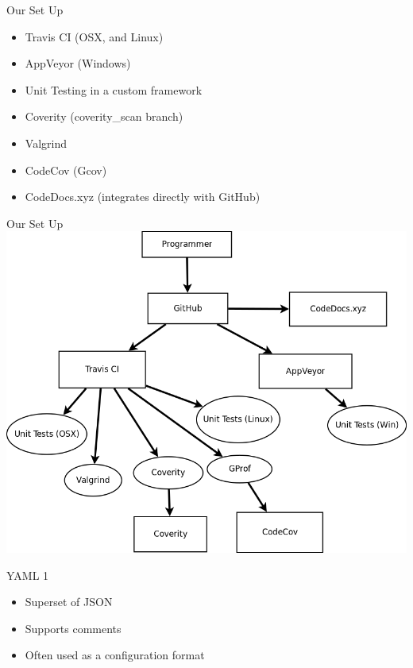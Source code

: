 \documentclass{beamer}
\begin{document}
\begin{frame}{Our Set Up}
	\begin{itemize}
		\item Travis CI (OSX, and Linux)
		\item AppVeyor (Windows)
		\item Unit Testing in a custom framework
		\item Coverity (coverity\_scan branch)
		\item Valgrind
		\item CodeCov (Gcov)
		\item CodeDocs.xyz (integrates directly with GitHub)
	\end{itemize}
\end{frame}

\begin{frame}{Our Set Up}
	\includegraphics[width=\linewidth]{setup.png}
\end{frame}

\begin{frame}{YAML 1}
	\begin{itemize}
		\item Superset of JSON
		\item Supports comments
		\item Often used as a configuration format
	\end{itemize}
\end{frame}

\end{document}
